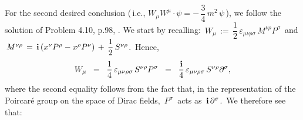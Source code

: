 \vskip 0.1cm
\noindent
For the second desired conclusion (\,i.e., $W_{\mu}W^{\mu}\cdot\psi = -\,\dfrac{3}{4}\,m^{2}\,\psi$\,),
we follow the solution of Problem 4.10, p.98, \cite{Radovanovic2008}.
We start by recalling:
\,$W_{\mu} \,:=\, \dfrac{1}{2}\,\varepsilon_{\mu\nu\rho\sigma}\,M^{\nu\rho}P^{\sigma}$\,
and
\,$M^{\nu\rho} \,=\, \mathbf{i}\left(x^{\nu}P^{\rho} - x^{\rho}P^{\nu}\right) \,+\, \dfrac{1}{2}\,S^{\nu\rho}$.\,
Hence,
\begin{equation*}
W_{\mu}
\;\; = \;\;
    \dfrac{1}{4}\,\varepsilon_{\mu\nu\rho\sigma}\,S^{\nu\rho}P^{\sigma}
\;\; = \;\;
    \dfrac{\mathbf{i}}{4}\,\varepsilon_{\mu\nu\rho\sigma}\,S^{\nu\rho}\partial^{\sigma},
\end{equation*}
where the second equality follows from the fact that,
in the representation of the Poircaré group on the space of Dirac fields,
\,$P^{\sigma}$\, acts as \,$\mathbf{i}\,\partial^{\sigma}$.\,
We therefore see that:
